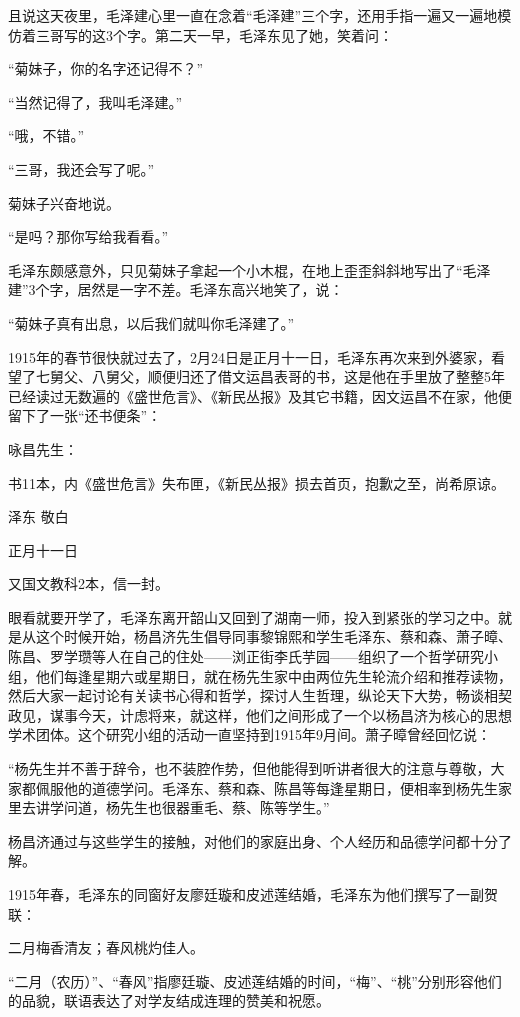 \documentclass[../../dazhuan.tex]{subfiles}
\begin{document}
且说这天夜里，毛泽建心里一直在念着“毛泽建”三个字，还用手指一遍又一遍地模仿着三哥写的这3个字。第二天一早，毛泽东见了她，笑着问：

“菊妹子，你的名字还记得不？”

“当然记得了，我叫毛泽建。”

“哦，不错。”

“三哥，我还会写了呢。” 

菊妹子兴奋地说。

“是吗？那你写给我看看。”

毛泽东颇感意外，只见菊妹子拿起一个小木棍，在地上歪歪斜斜地写出了“毛泽建”3个字，居然是一字不差。毛泽东高兴地笑了，说：

“菊妹子真有出息，以后我们就叫你毛泽建了。”

1915年的春节很快就过去了，2月24日是正月十一日，毛泽东再次来到外婆家，看望了七舅父、八舅父，顺便归还了借文运昌表哥的书，这是他在手里放了整整5年已经读过无数遍的《盛世危言》、《新民丛报》及其它书籍，因文运昌不在家，他便留下了一张“还书便条”：

咏昌先生：

书11本，内《盛世危言》失布匣，《新民丛报》损去首页，抱歉之至，尚希原谅。

泽东 敬白

正月十一日

又国文教科2本，信一封。

眼看就要开学了，毛泽东离开韶山又回到了湖南一师，投入到紧张的学习之中。就是从这个时候开始，杨昌济先生倡导同事黎锦熙和学生毛泽东、蔡和森、萧子暲、陈昌、罗学瓒等人在自己的住处——浏正街李氏芋园——组织了一个哲学研究小组，他们每逢星期六或星期日，就在杨先生家中由两位先生轮流介绍和推荐读物，然后大家一起讨论有关读书心得和哲学，探讨人生哲理，纵论天下大势，畅谈相契政见，谋事今天，计虑将来，就这样，他们之间形成了一个以杨昌济为核心的思想学术团体。这个研究小组的活动一直坚持到1915年9月间。萧子暲曾经回忆说：

“杨先生并不善于辞令，也不装腔作势，但他能得到听讲者很大的注意与尊敬，大家都佩服他的道德学问。毛泽东、蔡和森、陈昌等每逢星期日，便相率到杨先生家里去讲学问道，杨先生也很器重毛、蔡、陈等学生。”

杨昌济通过与这些学生的接触，对他们的家庭出身、个人经历和品德学问都十分了解。

1915年春，毛泽东的同窗好友廖廷璇和皮述莲结婚，毛泽东为他们撰写了一副贺联：

二月梅香清友；春风桃灼佳人。

“二月（农历）”、“春风”指廖廷璇、皮述莲结婚的时间，“梅”、“桃”分别形容他们的品貌，联语表达了对学友结成连理的赞美和祝愿。
\end{document}
